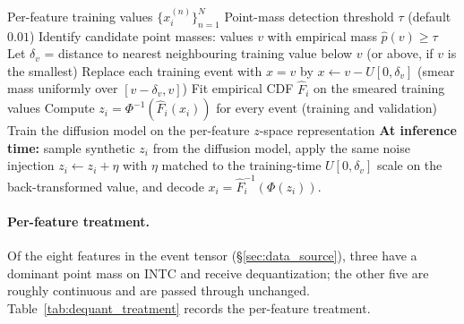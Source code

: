 \documentclass[journal]{IEEEtran}
\theoremstyle{definition}   %
\begin{document}
\begin{algorithm}[ht]
\caption{Per-feature dequantization preprocessor (v9 pipeline)}
\label{alg:dequant}
\begin{algorithmic}[1]
\Require Per-feature training values $\{x_i^{(n)}\}_{n=1}^{N}$
\Require Point-mass detection threshold $\tau$ (default $0.01$)
    \State Identify candidate point masses: values
    $v$ with empirical mass $\widehat{p}(v) \ge \tau$
        \State Let $\delta_v$ = distance to nearest neighbouring
        training value below $v$ (or above, if $v$ is the
        smallest)
        \State Replace each training event with $x = v$ by
        $x \leftarrow v - U[0, \delta_v]$ (smear mass uniformly
        over $[v - \delta_v, v]$)
    \EndFor
    \State Fit empirical CDF $\widehat{F}_i$ on the smeared
    training values
    \State Compute $z_i = \Phi^{-1}(\widehat{F}_i(x_i))$ for every
    event (training and validation)
\EndFor
\State Train the diffusion model on the per-feature $z$-space
representation
\State \textbf{At inference time:} sample synthetic $z_i$ from the
diffusion model, apply the same noise injection
$z_i \leftarrow z_i + \eta$ with $\eta$ matched to the training-time
$U[0, \delta_v]$ scale on the back-transformed value, and decode
$x_i = \widehat{F}_i^{-1}(\Phi(z_i))$.
\end{algorithmic}
\end{algorithm}

\paragraph{Per-feature treatment.}
Of the eight features in the event tensor (\S\ref{sec:data_source}),
three have a dominant point mass on INTC and receive dequantization;
the other five are roughly continuous and are passed through
unchanged. Table~\ref{tab:dequant_treatment} records the
per-feature treatment.
\end{document}
